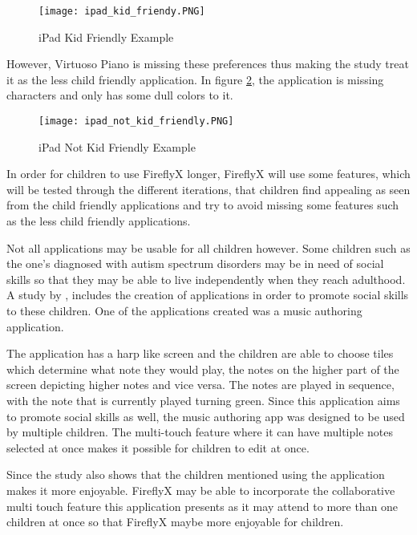 \begin{figure}[H]
    \centering
    \texttt{[image: ipad\_kid\_friendy.PNG]}
    \caption{iPad Kid Friendly Example \protect\cite{burton2016music}}
    \label{fig:iPad_friendly}
\end{figure}

However, Virtuoso Piano is missing these preferences thus making the study treat it as the less child friendly application. In figure \ref{fig:iPad_unfriendly}, the application is missing characters and only has some dull colors to it. 

\begin{figure}[H]
    \centering
    \texttt{[image: ipad\_not\_kid\_friendly.PNG]}
    \caption{iPad Not Kid Friendly Example \protect\cite{burton2016music}}
    \label{fig:iPad_unfriendly}
\end{figure}

In order for children to use FireflyX longer, FireflyX will use some features, which will be tested through the different iterations, that children find appealing as seen from the child friendly applications and try to avoid missing some features such as the less child friendly applications.


Not all applications may be usable for all children however. Some children such as the one’s diagnosed with autism spectrum disorders may be in need of social skills so that they may be able to live independently when they reach adulthood. A study by , includes the creation of applications in order to promote social skills to these children. One of the applications created was a music authoring application. 

The application has a harp like screen and the children are able to choose tiles which determine what note they would play, the notes on the higher part of the screen depicting higher notes and vice versa. The notes are played in sequence, with the note that is currently played turning green. Since this application aims to promote social skills as well, the music authoring app was designed to be used by multiple children. The multi-touch feature where it can have multiple notes selected at once makes it possible for children to edit at once. 

Since the study also shows that the children mentioned using the application makes it more enjoyable. FireflyX may be able to incorporate the collaborative multi touch feature this application presents as it may attend to more than one children at once so that FireflyX maybe more enjoyable for children.

